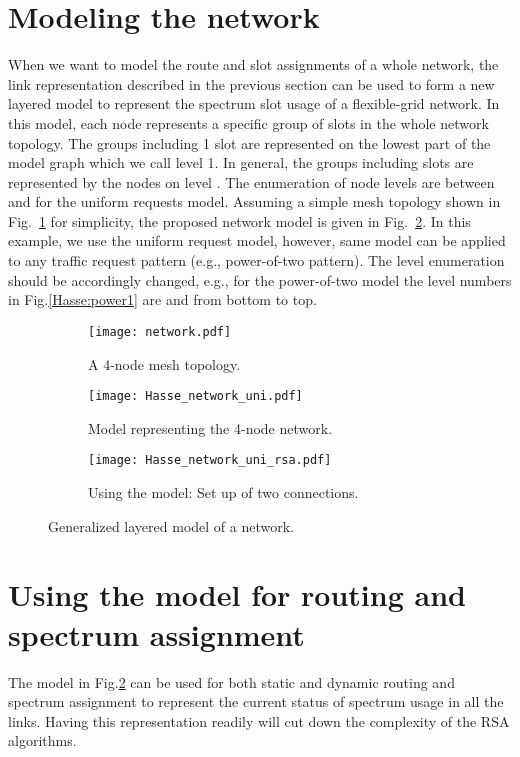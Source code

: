 \documentclass[letterpaper,10pt]{article}\pdfoutput=1
\begin{document}
\section{Modeling the network}
When we want to model the route and slot assignments of a whole network, the link representation 
described in the previous section can be used to form a new layered model to represent the spectrum
slot usage of a flexible-grid network.
In this model, each node represents a specific group of slots in the whole network 
topology. The groups including 1 slot are represented on the lowest part of the model graph which we call
level 1. In general, the groups including  slots are represented by the nodes on level .
The enumeration of node levels are between  and  for the uniform requests model. 
Assuming a simple mesh topology shown in Fig.~\ref{network:4node} for simplicity,
the proposed network model is given in Fig.~\ref{network:model}. In this example, 
we use the uniform request model, however, same model can be applied to any
traffic request pattern (e.g., power-of-two pattern). The level enumeration should be accordingly changed, e.g.,
for the power-of-two model the level numbers in Fig.\ref{Hasse:power1} are  and  from bottom to top. 
\begin{figure}[t]
\centering
\begin{subfigure}{0.10\textwidth}
\centering
\texttt{[image: network.pdf]}
\caption{A 4-node mesh topology.}
\label{network:4node}
\end{subfigure}
\begin{subfigure}{0.44\textwidth}
\centering
\texttt{[image: Hasse\_network\_uni.pdf]}
\caption{Model representing the 4-node network.}
\label{network:model}
\end{subfigure}
\begin{subfigure}{0.44\textwidth}
\centering
\texttt{[image: Hasse\_network\_uni\_rsa.pdf]}
\caption{Using the model: Set up of two connections.}
\label{network:rsa_ex}
\end{subfigure}
\vspace{-0.5cm}
\caption{Generalized layered model of a network.}
\vspace{-0.8cm}
\end{figure}

\section{Using the model for routing and spectrum assignment}
The model in Fig.\ref{network:model} can be used for both static and dynamic routing and spectrum assignment
to represent the current status of spectrum usage in all the links. Having this representation readily will
cut down the complexity of the RSA algorithms.
\end{document}
